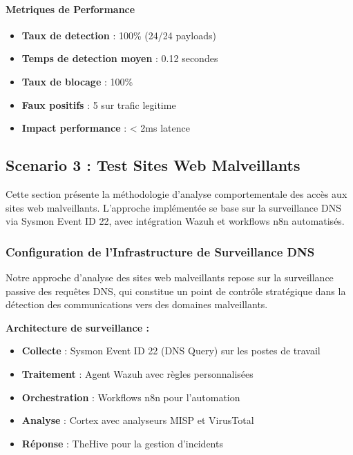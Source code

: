 \paragraph{Metriques de Performance}
\begin{itemize}
    \item \textbf{Taux de detection} : 100\% (24/24 payloads)
    \item \textbf{Temps de detection moyen} : 0.12 secondes
    \item \textbf{Taux de blocage} : 100\%
    \item \textbf{Faux positifs} : 5 sur trafic legitime
    \item \textbf{Impact performance} : < 2ms latence
\end{itemize}




\subsection{Scenario 3 : Test Sites Web Malveillants}

Cette section présente la méthodologie d'analyse comportementale des accès aux sites web malveillants. L'approche implémentée se base sur la surveillance DNS via Sysmon Event ID 22, avec intégration Wazuh et workflows n8n automatisés.

\subsubsection{Configuration de l'Infrastructure de Surveillance DNS}

Notre approche d'analyse des sites web malveillants repose sur la surveillance passive des requêtes DNS, qui constitue un point de contrôle stratégique dans la détection des communications vers des domaines malveillants.

\textbf{Architecture de surveillance :}
\begin{itemize}
    \item \textbf{Collecte} : Sysmon Event ID 22 (DNS Query) sur les postes de travail
    \item \textbf{Traitement} : Agent Wazuh avec règles personnalisées
    \item \textbf{Orchestration} : Workflows n8n pour l'automation
    \item \textbf{Analyse} : Cortex avec analyseurs MISP et VirusTotal
    \item \textbf{Réponse} : TheHive pour la gestion d'incidents
\end{itemize}

